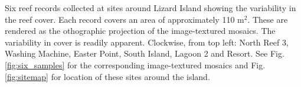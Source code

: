 \label{fig:reef_record_example_bathy} Six reef records collected at sites around Lizard Island showing the variability in the reef cover. Each record covers an area of approximately 110 m$^2$. These are rendered as the othographic projection of the image-textured mosaics. The variability in cover is readily apparent. Clockwise, from top left: North Reef 3, Washing Machine, Easter Point, South Island, Lagoon 2 and Resort. See Fig. \ref{fig:six_samples} for the corresponding image-textured mosaics and Fig. \ref{fig:sitemap} for location of these sites around the island.